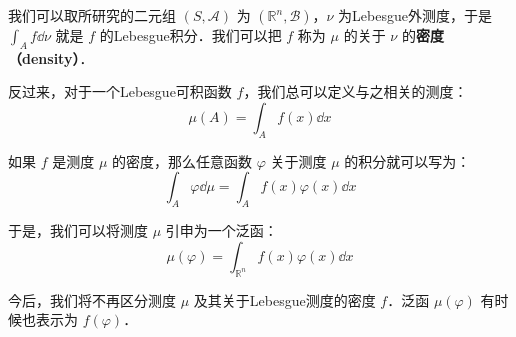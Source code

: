 我们可以取所研究的二元组 $(S, \mathcal{A})$ 为 $(\mathbb{R}^n, \mathcal{B})$，$\nu$ 为Lebesgue外测度，于是 $\int_A f \dd \nu$ 就是 $f$ 的Lebesgue积分．我们可以把 $f$ 称为 $\mu$ 的关于 $\nu$ 的\textbf{密度（density）}．

反过来，对于一个Lebesgue可积函数 $f$，我们总可以定义与之相关的测度：
\begin{equation}
\mu(A) = \int_A f(x) \dd x
\end{equation}

如果 $f$ 是测度 $\mu$ 的密度，那么任意函数 $\varphi$ 关于测度 $\mu$ 的积分就可以写为：
\begin{equation}
\int_A \varphi \dd \mu = \int_A f(x)\varphi(x) \dd x
\end{equation}

于是，我们可以将测度 $\mu$ 引申为一个泛函：
\begin{equation}
\mu(\varphi) = \int_{\mathbb{R}^n} f(x)\varphi(x) \dd x
\end{equation}

今后，我们将不再区分测度 $\mu$ 及其关于Lebesgue测度的密度 $f$．泛函 $\mu(\varphi)$ 有时候也表示为 $f(\varphi)$．












